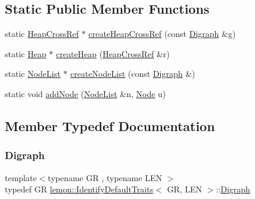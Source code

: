 \subsection*{Static Public Member Functions}
\begin{DoxyCompactItemize}
\item 
static \hyperlink{structlemon_1_1_identify_default_traits_a05e9c5d0e980eb5f75a09449fc7d597f}{Heap\+Cross\+Ref} $\ast$ \hyperlink{structlemon_1_1_identify_default_traits_a17ee2bd5691be1d00565f999fec63d47}{create\+Heap\+Cross\+Ref} (const \hyperlink{structlemon_1_1_identify_default_traits_a5fddb27be8d17b86b2c4f94e72b8a8da}{Digraph} \&g)
\item 
static \hyperlink{structlemon_1_1_identify_default_traits_abb89b2848e63f4cb0712ca701db72aa4}{Heap} $\ast$ \hyperlink{structlemon_1_1_identify_default_traits_a28654afa585a6b293ebd0afaf78b4411}{create\+Heap} (\hyperlink{structlemon_1_1_identify_default_traits_a05e9c5d0e980eb5f75a09449fc7d597f}{Heap\+Cross\+Ref} \&r)
\item 
static \hyperlink{structlemon_1_1_identify_default_traits_ac7ceaa832e1553cd7fda8d3edc14023e}{Node\+List} $\ast$ \hyperlink{structlemon_1_1_identify_default_traits_a3c15b93174b21ed7afca1f2c20aac7bc}{create\+Node\+List} (const \hyperlink{structlemon_1_1_identify_default_traits_a5fddb27be8d17b86b2c4f94e72b8a8da}{Digraph} \&)
\item 
static void \hyperlink{structlemon_1_1_identify_default_traits_aa127d5835d6adf71c52ef3806d8d3e2d}{add\+Node} (\hyperlink{structlemon_1_1_identify_default_traits_ac7ceaa832e1553cd7fda8d3edc14023e}{Node\+List} \&n, \hyperlink{structlemon_1_1_identify_default_traits_a8cd1d66e1f5de579d028a3b18561ea5a}{Node} u)
\end{DoxyCompactItemize}


\subsection{Member Typedef Documentation}
\mbox{\label{structlemon_1_1_identify_default_traits_a5fddb27be8d17b86b2c4f94e72b8a8da}} 
\subsubsection{\texorpdfstring{Digraph}{Digraph}}
{\footnotesize\ttfamily template$<$typename GR , typename L\+EN $>$ \\
typedef GR \hyperlink{structlemon_1_1_identify_default_traits}{lemon\+::\+Identify\+Default\+Traits}$<$ GR, L\+EN $>$\+::\hyperlink{structlemon_1_1_identify_default_traits_a5fddb27be8d17b86b2c4f94e72b8a8da}{Digraph}}

